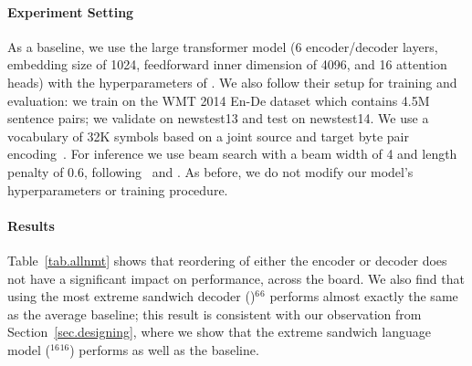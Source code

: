 \documentclass[11pt,a4paper]{article}
\begin{document}
\paragraph{Experiment Setting}
As a baseline, we use the large transformer model (6 encoder/decoder layers, embedding size of 1024, feedforward inner dimension of 4096, and 16 attention heads) with the hyperparameters of \citet{scalingnmt}. We also follow their setup for training and evaluation: we train on the WMT 2014 En-De dataset which contains 4.5M sentence pairs; we validate on newstest13 and test on newstest14. We use a vocabulary of 32K symbols based on a joint source and target byte pair encoding~\cite{bpe}. For inference we use beam search with a beam width of 4 and length penalty of 0.6, following~\citet{AIAYN} and \citet{scalingnmt}. As before, we do not modify our model's hyperparameters or training procedure.

\paragraph{Results}
Table~\ref{tab.allnmt} shows that reordering of either the encoder or decoder does not have a significant impact on performance, across the board.
We also find that using the most extreme sandwich decoder ({\Large \texttt{}}{\Large \texttt{}})$^{6}${\Large \texttt{}}$^{6}$ performs almost exactly the same as the average baseline; this result is consistent with our observation from Section~\ref{sec.designing}, where we show that the extreme sandwich language model ({\Large \texttt{}}$^{16}${\Large \texttt{}}$^{16}$) performs as well as the baseline.
\end{document}
